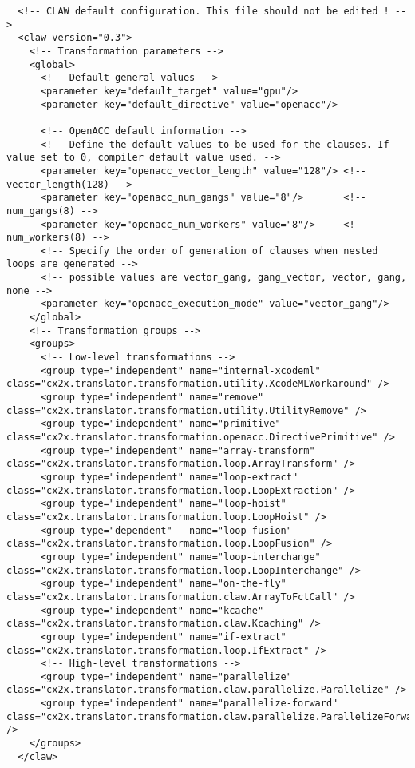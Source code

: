 \documentclass{article}
\begin{document}
\begin{lstlisting}
  <!-- CLAW default configuration. This file should not be edited ! -->
  <claw version="0.3">
    <!-- Transformation parameters -->
    <global>
      <!-- Default general values -->
      <parameter key="default_target" value="gpu"/>
      <parameter key="default_directive" value="openacc"/>

      <!-- OpenACC default information -->
      <!-- Define the default values to be used for the clauses. If value set to 0, compiler default value used. -->
      <parameter key="openacc_vector_length" value="128"/> <!-- vector_length(128) -->
      <parameter key="openacc_num_gangs" value="8"/>       <!-- num_gangs(8) -->
      <parameter key="openacc_num_workers" value="8"/>     <!-- num_workers(8) -->
      <!-- Specify the order of generation of clauses when nested loops are generated -->
      <!-- possible values are vector_gang, gang_vector, vector, gang, none -->
      <parameter key="openacc_execution_mode" value="vector_gang"/>
    </global>
    <!-- Transformation groups -->
    <groups>
      <!-- Low-level transformations -->
      <group type="independent" name="internal-xcodeml"    class="cx2x.translator.transformation.utility.XcodeMLWorkaround" />
      <group type="independent" name="remove"              class="cx2x.translator.transformation.utility.UtilityRemove" />
      <group type="independent" name="primitive"           class="cx2x.translator.transformation.openacc.DirectivePrimitive" />
      <group type="independent" name="array-transform"     class="cx2x.translator.transformation.loop.ArrayTransform" />
      <group type="independent" name="loop-extract"        class="cx2x.translator.transformation.loop.LoopExtraction" />
      <group type="independent" name="loop-hoist"          class="cx2x.translator.transformation.loop.LoopHoist" />
      <group type="dependent"   name="loop-fusion"         class="cx2x.translator.transformation.loop.LoopFusion" />
      <group type="independent" name="loop-interchange"    class="cx2x.translator.transformation.loop.LoopInterchange" />
      <group type="independent" name="on-the-fly"          class="cx2x.translator.transformation.claw.ArrayToFctCall" />
      <group type="independent" name="kcache"              class="cx2x.translator.transformation.claw.Kcaching" />
      <group type="independent" name="if-extract"          class="cx2x.translator.transformation.loop.IfExtract" />
      <!-- High-level transformations -->
      <group type="independent" name="parallelize"         class="cx2x.translator.transformation.claw.parallelize.Parallelize" />
      <group type="independent" name="parallelize-forward" class="cx2x.translator.transformation.claw.parallelize.ParallelizeForward" />
    </groups>
  </claw>
\end{lstlisting}
\end{document}
